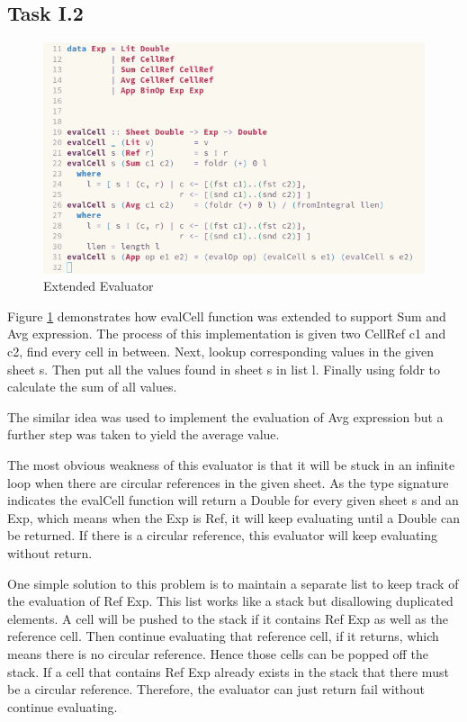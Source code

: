 \documentclass{article}
\begin{document}
\begin{normalsize}
  \section{Task I.2}

  \begin{figure}[H]
    \centering
    \centerline{\includegraphics[scale=0.6]{Sheet}}
    \caption{Extended Evaluator}
    \label{fig:sheet}
  \end{figure}

  Figure \ref{fig:sheet} demonstrates how evalCell function was extended to support Sum and Avg expression. The process of this implementation is given two CellRef c1 and c2, find every cell in between. Next, lookup corresponding values in the given sheet s. Then put all the values found in sheet s in list l. Finally using foldr to calculate the sum of all values.

  The similar idea was used to implement the evaluation of Avg expression but
  a further step was taken to yield the average value.

  The most obvious weakness of this evaluator is that it will be stuck in an infinite loop when there are circular references in the given sheet. As the type
  signature indicates the evalCell function will return a Double for every
  given sheet s and an Exp, which means when the Exp is Ref, it will keep
  evaluating until a Double can be returned. If there is a circular reference,
  this evaluator will keep evaluating without return.

  One simple solution to this problem is to maintain a separate list to keep
  track of the evaluation of Ref Exp. This list works like a stack but
  disallowing duplicated elements. A cell will be pushed to the stack if it contains Ref Exp as well as the reference cell. Then continue evaluating that reference cell,
  if it returns, which means there is no circular reference. Hence those cells can be popped off the stack. If a cell that contains Ref Exp already exists in the stack that there must be a circular reference. Therefore, the evaluator can just return fail without continue evaluating.


\end{normalsize}
\end{document}
